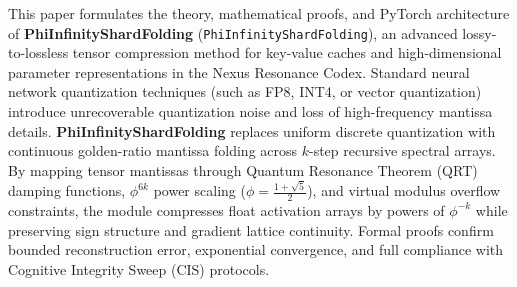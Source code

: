 \begin{abstractbox}
This paper formulates the theory, mathematical proofs, and PyTorch architecture of \textbf{PhiInfinityShardFolding} (\texttt{PhiInfinityShardFolding}), an advanced lossy-to-lossless tensor compression method for key-value caches and high-dimensional parameter representations in the Nexus Resonance Codex. Standard neural network quantization techniques (such as FP8, INT4, or vector quantization) introduce unrecoverable quantization noise and loss of high-frequency mantissa details. \textbf{PhiInfinityShardFolding} replaces uniform discrete quantization with continuous golden-ratio mantissa folding across $k$-step recursive spectral arrays. By mapping tensor mantissas through Quantum Resonance Theorem (QRT) damping functions, $\phi^{6k}$ power scaling ($\phi = \frac{1+\sqrt{5}}{2}$), and virtual modulus overflow constraints, the module compresses float activation arrays by powers of $\phi^{-k}$ while preserving sign structure and gradient lattice continuity. Formal proofs confirm bounded reconstruction error, exponential convergence, and full compliance with Cognitive Integrity Sweep (CIS) protocols.
\end{abstractbox}
